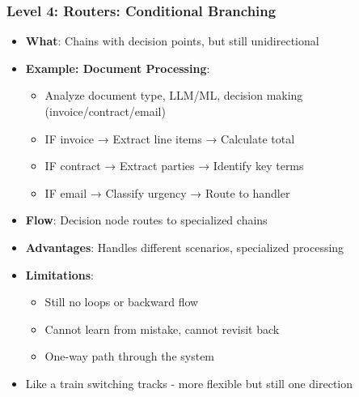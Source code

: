 \begin{frame}[fragile]\frametitle{Level 4: Routers: Conditional Branching}
      \begin{itemize}
        \item \textbf{What}: Chains with decision points, but still unidirectional
        \item \textbf{Example: Document Processing}:
        \begin{itemize}
            \item Analyze document type, LLM/ML, decision making (invoice/contract/email)
            \item IF invoice → Extract line items → Calculate total
            \item IF contract → Extract parties → Identify key terms
            \item IF email → Classify urgency → Route to handler
        \end{itemize}
        \item \textbf{Flow}: Decision node routes to specialized chains
        \item \textbf{Advantages}: Handles different scenarios, specialized processing
        \item \textbf{Limitations}:
        \begin{itemize}
            \item Still no loops or backward flow
            \item Cannot learn from mistake, cannot revisit back
            \item One-way path through the system
        \end{itemize}
        \item Like a train switching tracks - more flexible but still one direction
      \end{itemize}
\end{frame}

